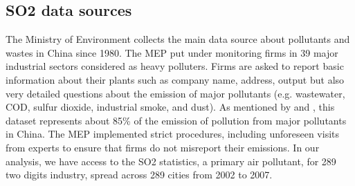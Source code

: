 \documentclass[12pt]{article}
\begin{document}
\subsection{SO2 data sources} \label{sec:so2}

The Ministry of Environment collects the main data source about pollutants and wastes in China since 1980. The MEP put under monitoring firms in 39 major industrial sectors considered as heavy polluters. Firms are asked to report basic information about their plants such as company name, address, output but also very detailed questions about the emission of major pollutants (e.g. wastewater, COD, sulfur dioxide, industrial smoke, and dust). As mentioned by \cite{Wu2017-bl} and \cite{Jiang2014-pf}, this dataset represents about 85\% of the emission of pollution from major pollutants in China. The MEP implemented strict procedures, including unforeseen visits from experts to ensure that firms do not misreport their emissions. In our analysis, we have access to the SO2 statistics, a primary air pollutant, for 289 two digits industry, spread across 289 cities from 2002 to 2007.
\end{document}

